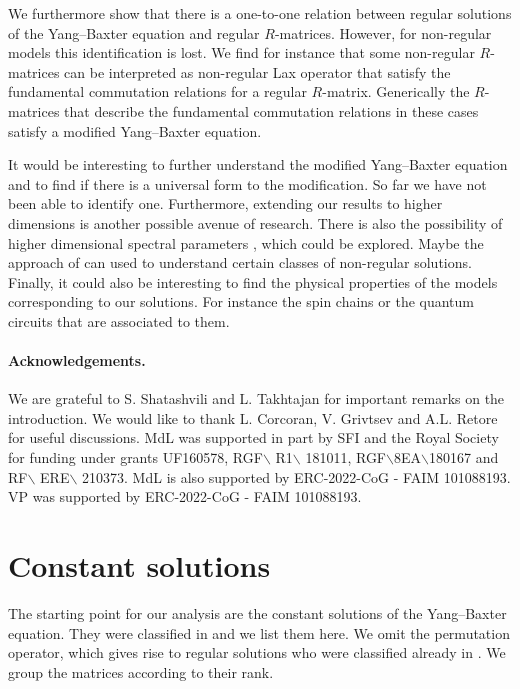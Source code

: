 \documentclass{article}
\begin{document}
We furthermore show that there is a one-to-one relation between regular solutions of the Yang--Baxter equation and regular $R$-matrices. However, for non-regular models this identification is lost. We find for instance that some non-regular $R$-matrices can be interpreted as non-regular Lax operator that satisfy the fundamental commutation relations for a regular $R$-matrix. Generically the $R$-matrices that describe the fundamental commutation relations in these cases satisfy a modified Yang--Baxter equation.

It would be interesting to further understand the modified Yang--Baxter equation and to find if there is a universal form to the modification. So far we have not been able to identify one. Furthermore, extending our results to higher dimensions is another possible avenue of research. There is also the possibility of higher dimensional spectral parameters \cite{Korepin_Bogoliubov_Izergin_1993}, which could be explored. Maybe the approach of \cite{Maity:2024vtr} can used to understand certain classes of non-regular solutions. Finally, it could also be interesting to find the physical properties of the models corresponding to our solutions. For instance the spin chains or the quantum circuits that are associated to them.

\paragraph{Acknowledgements.}

We are grateful to S. Shatashvili and L. Takhtajan for important remarks on the introduction. We would like to thank L. Corcoran, V. Grivtsev and A.L. Retore for useful discussions. MdL was supported in part by SFI and the Royal Society for funding under grants UF160578, RGF$\backslash$ R1$\backslash$ 181011, RGF$\backslash$8EA$\backslash$180167 and RF$\backslash$ ERE$\backslash$ 210373. MdL is also supported by ERC-2022-CoG - FAIM 101088193. VP was supported by ERC-2022-CoG - FAIM 101088193.

\appendix

\section{Constant solutions}
\label{constantsolutions}
The starting point for our analysis are the constant solutions of the Yang--Baxter equation. They were classified in \cite{HIETARINTA} and we list them here. We omit the permutation operator, which gives rise to regular solutions who were classified already in \cite{Corcoran:2023zax}.  We group the matrices according to their rank. 
\end{document}

